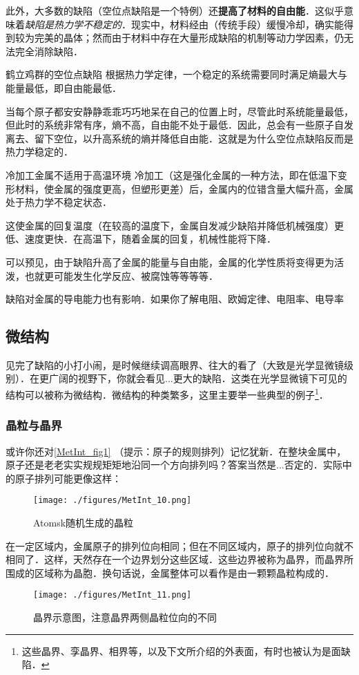 此外，大多数的缺陷（空位点缺陷是一个特例）还\textbf{提高了材料的自由能}．这似乎意味着\textsl{缺陷是热力学不稳定的}．现实中，材料经由（传统手段）缓慢冷却，确实能得到较为完美的晶体；然而由于材料中存在大量形成缺陷的机制等动力学因素，仍无法完全消除缺陷．

\begin{example}{鹤立鸡群的空位点缺陷}
根据热力学定律，一个稳定的系统需要同时满足熵最大与能量最低，即自由能最低．

当每个原子都安安静静乖乖巧巧地呆在自己的位置上时，尽管此时系统能量最低，但此时的系统非常有序，熵不高，自由能不处于最低．因此，总会有一些原子自发离去、留下空位，以升高系统的熵并降低自由能．这就是为什么空位点缺陷反而是热力学稳定的．
\end{example}

\begin{example}{冷加工金属不适用于高温环境}
冷加工（这是强化金属的一种方法，即在低温下变形材料，使金属的强度更高，但塑形更差）后，金属内的位错含量大幅升高，金属处于热力学不稳定状态．

这使金属的回复温度（在较高的温度下，金属自发减少缺陷并降低机械强度）更低、速度更快．在高温下，随着金属的回复，机械性能将下降．
\end{example}
可以预见，由于缺陷升高了金属的能量与自由能，金属的化学性质将变得更为活泼，也就更可能发生化学反应、被腐蚀等等等等．

缺陷对金属的导电能力也有影响．如果你了解电阻、欧姆定律、电阻率、电导率

\subsection{微结构}
见完了缺陷的小打小闹，是时候继续调高眼界、往大的看了（大致是光学显微镜级别）．在更广阔的视野下，你就会看见...更大的缺陷．这类在光学显微镜下可见的结构可以被称为微结构．微结构的种类繁多，这里主要举一些典型的例子\footnote{这些晶界、孪晶界、相界等，以及下文所介绍的外表面，有时也被认为是面缺陷．}．

\subsubsection{晶粒与晶界}
或许你还对\autoref{MetInt_fig1} （提示：原子的规则排列）记忆犹新．在整块金属中，原子还是老老实实规规矩矩地沿同一个方向排列吗？答案当然是...否定的．实际中的原子排列可能更像这样：
\begin{figure}[ht]
\centering
\texttt{[image: ./figures/MetInt\_10.png]}
\caption{Atomsk随机生成的晶粒} \label{MetInt_fig10}
\end{figure}
在一定区域内，金属原子的排列位向相同；但在不同区域内，原子的排列位向就不相同了．这样，天然存在一个边界划分这些区域．这些边界被称为晶界，而晶界所围成的区域称为晶胞．换句话说，金属整体可以看作是由一颗颗晶粒构成的．
\begin{figure}[ht]
\centering
\texttt{[image: ./figures/MetInt\_11.png]}
\caption{晶界示意图，注意晶界两侧晶粒位向的不同} \label{MetInt_fig11}
\end{figure}

